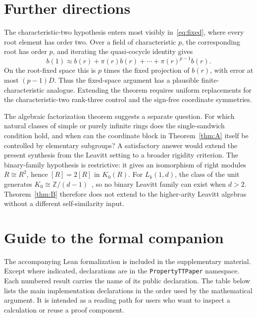 \documentclass[11pt]{amsart}
\theoremstyle{definition}
\theoremstyle{plain}
\begin{document}
\section{Further directions}\label{sec:directions}

The characteristic-two hypothesis enters most visibly
in~\eqref{eq:fixed}, where every root element has order two.  Over a
field of characteristic \(p\), the corresponding root has order
\(p\), and iterating the quasi-cocycle identity gives
\[
  b(1)\approx
  b(r)+\pi(r)b(r)+\cdots+\pi(r)^{p-1}b(r).
\]
On the root-fixed space this is \(p\) times the fixed projection of
\(b(r)\), with error at most \((p-1)D\).  Thus the fixed-space
argument has a plausible finite-characteristic analogue.  Extending
the theorem requires uniform replacements for the
characteristic-two rank-three control and the sign-free coordinate
symmetries.

The algebraic factorization theorem suggests a separate question.
For which natural classes of simple or purely infinite rings does
the single-sandwich condition hold, and when can the coordinate
block in Theorem~\ref{thm:A} itself be controlled by elementary
subgroups?  A satisfactory answer would extend the present
synthesis from the Leavitt setting to a broader rigidity criterion.
The binary-family hypothesis is restrictive: it gives an isomorphism
of right modules \(R\cong R^2\), hence \([R]=2[R]\) in \(K_0(R)\).
For \(L_k(1,d)\), the class of the unit generates
\(K_0\cong\mathbb Z/(d-1)\)~\cite{AraBrustengaCortinas}, so no binary Leavitt family can exist
when \(d>2\).  Theorem~\ref{thm:B} therefore does not extend to the
higher-arity Leavitt algebras without a different self-similarity
input.

\appendix
\section{Guide to the formal companion}\label{app:formal}

The accompanying Lean formalization is included in the supplementary
material.
Except where indicated, declarations are in the
\nolinkurl{PropertyTTPaper} namespace.
Each numbered result carries the name of its public declaration.
The table below lists the main implementation declarations in the
order used by the mathematical argument.  It is intended as a reading
path for users who want to inspect a calculation or reuse a proof
component.
\end{document}
